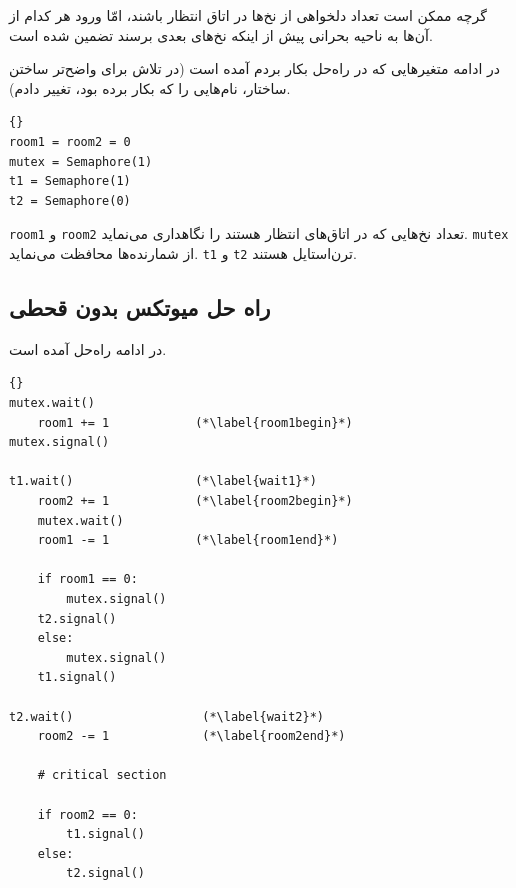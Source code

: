 \documentclass{book}
\newcommand{\clearemptydoublepage}{\newpage\cleardoublepage}
\begin{document}
    گرچه ممکن است تعداد دلخواهی از نخ‌ها در اتاق انتظار باشند، امّا  ورود هر کدام از آن‌ها به ناحیه بحرانی پیش از اینکه نخ‌های بعدی برسند تضمین شده است. 

    در ادامه متغیرهایی که در راه‌حل بکار بردم آمده است (در تلاش برای واضح‌تر ساختن ساختار، نام‌هایی را که  بکار برده بود، تغییر دادم). 

\begin{latin}
\begin{lstlisting}[title=\rl{راهنمایی میوتکس بدون قحطی}]{}
room1 = room2 = 0
mutex = Semaphore(1)
t1 = Semaphore(1)
t2 = Semaphore(0)
\end{lstlisting}
\end{latin}

    {\tt room1} و  {\tt room2} 
    تعداد نخ‌هایی که در اتاق‌های انتظار هستند را نگاهداری می‌نماید. {\tt mutex} از شمارنده‌ها محافظت می‌نماید. {\tt t1} و {\tt t2}
    ترن‌استایل هستند. 
    


\clearemptydoublepage
\subsection{راه حل میوتکس بدون قحطی}

    در ادامه راه‌حل  آمده است. 

\begin{latin}
\begin{lstlisting}[title=\rl{الگوریتم  \lr{Morris}}]{}
mutex.wait()
    room1 += 1            (*\label{room1begin}*)
mutex.signal()
                           
t1.wait()                 (*\label{wait1}*)
    room2 += 1            (*\label{room2begin}*)
    mutex.wait()
    room1 -= 1            (*\label{room1end}*)

    if room1 == 0: 
        mutex.signal()
	t2.signal()
    else: 
        mutex.signal()
	t1.signal()

t2.wait()                  (*\label{wait2}*)
    room2 -= 1             (*\label{room2end}*)

    # critical section

    if room2 == 0:
        t1.signal()
    else:
        t2.signal()
\end{lstlisting}
\end{latin}
\end{document}
